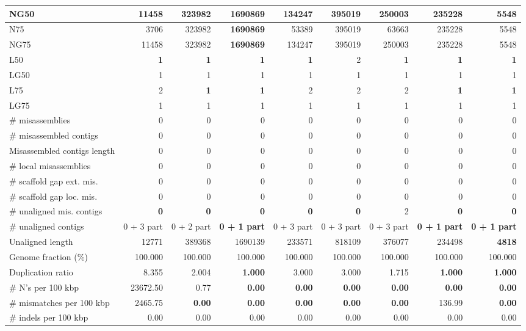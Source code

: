 \documentclass[12pt,a4paper]{article}
\begin{document}
\begin{table}[ht]
\begin{center}
\begin{tabular}{|l*{8}{|r}|}
NG50 & 11458 & 323982 & {\bf 1690869} & 134247 & 395019 & 250003 & 235228 & 5548 \\ \hline
N75 & 3706 & 323982 & {\bf 1690869} & 53389 & 395019 & 63663 & 235228 & 5548 \\ \hline
NG75 & 11458 & 323982 & {\bf 1690869} & 134247 & 395019 & 250003 & 235228 & 5548 \\ \hline
L50 & {\bf 1} & {\bf 1} & {\bf 1} & {\bf 1} & 2 & {\bf 1} & {\bf 1} & {\bf 1} \\ \hline
LG50 & 1 & 1 & 1 & 1 & 1 & 1 & 1 & 1 \\ \hline
L75 & 2 & {\bf 1} & {\bf 1} & 2 & 2 & 2 & {\bf 1} & {\bf 1} \\ \hline
LG75 & 1 & 1 & 1 & 1 & 1 & 1 & 1 & 1 \\ \hline
\# misassemblies & 0 & 0 & 0 & 0 & 0 & 0 & 0 & 0 \\ \hline
\# misassembled contigs & 0 & 0 & 0 & 0 & 0 & 0 & 0 & 0 \\ \hline
Misassembled contigs length & 0 & 0 & 0 & 0 & 0 & 0 & 0 & 0 \\ \hline
\# local misassemblies & 0 & 0 & 0 & 0 & 0 & 0 & 0 & 0 \\ \hline
\# scaffold gap ext. mis. & 0 & 0 & 0 & 0 & 0 & 0 & 0 & 0 \\ \hline
\# scaffold gap loc. mis. & 0 & 0 & 0 & 0 & 0 & 0 & 0 & 0 \\ \hline
\# unaligned mis. contigs & {\bf 0} & {\bf 0} & {\bf 0} & {\bf 0} & {\bf 0} & 2 & {\bf 0} & {\bf 0} \\ \hline
\# unaligned contigs & 0 + 3 part & 0 + 2 part & {\bf 0 + 1 part} & 0 + 3 part & 0 + 3 part & 0 + 3 part & {\bf 0 + 1 part} & {\bf 0 + 1 part} \\ \hline
Unaligned length & 12771 & 389368 & 1690139 & 233571 & 818109 & 376077 & 234498 & {\bf 4818} \\ \hline
Genome fraction (\%) & 100.000 & 100.000 & 100.000 & 100.000 & 100.000 & 100.000 & 100.000 & 100.000 \\ \hline
Duplication ratio & 8.355 & 2.004 & {\bf 1.000} & 3.000 & 3.000 & 1.715 & {\bf 1.000} & {\bf 1.000} \\ \hline
\# N's per 100 kbp & 23672.50 & 0.77 & {\bf 0.00} & {\bf 0.00} & {\bf 0.00} & {\bf 0.00} & {\bf 0.00} & {\bf 0.00} \\ \hline
\# mismatches per 100 kbp & 2465.75 & {\bf 0.00} & {\bf 0.00} & {\bf 0.00} & {\bf 0.00} & {\bf 0.00} & 136.99 & {\bf 0.00} \\ \hline
\# indels per 100 kbp & 0.00 & 0.00 & 0.00 & 0.00 & 0.00 & 0.00 & 0.00 & 0.00 \\ \hline

\end{tabular}
\end{center}
\end{table}
\end{document}
